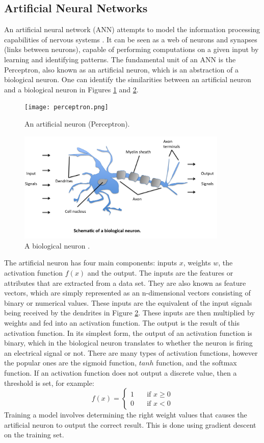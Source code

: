\documentclass{UoYCSproject}
\begin{document}
\subsection{Artificial Neural Networks}
An artificial neural network (ANN) attempts to model the information processing capabilities of nervous systems \cite{rojas2013neural}. It can be seen as a web of neurons and synapses (links between neurons), capable of performing computations on a given input by learning and identifying patterns. The fundamental unit of an ANN is the Perceptron, also known as an artificial neuron, which is an abstraction of a biological neuron. One can identify the similarities between an artificial neuron and a biological neuron in Figures \ref{fig:artificialneuron} and \ref{fig:biologicalneuron}.  

\begin{figure}[h]
\texttt{[image: perceptron.png]}
\centering
\caption{An artificial neuron (Perceptron).} 
\label{fig:artificialneuron}
\end{figure}

\begin{figure}[h]
\includegraphics[width=10cm]{perceptron_neuron.png}
\centering
\caption{A biological neuron \cite{neuron}.} 
\label{fig:biologicalneuron}
\end{figure}

The artificial neuron has four main components: inputs $x$, weights $w$, the activation function $f(x)$ and the output. The inputs are the features or attributes that are extracted from a data set. They are also known as feature vectors, which are simply represented as an n-dimensional vectors consisting of binary or numerical values. These inputs are the equivalent of the input signals being received by the dendrites in Figure \ref{fig:biologicalneuron}. These inputs are then multiplied by weights and fed into an activation function. The output is the result of this activation function. In its simplest form, the output of an activation function is binary, which in the biological neuron translates to whether the neuron is firing an electrical signal or not. There are many types of activation functions, however the popular ones are the sigmoid function, $tanh$ function, and the softmax function. If an activation function does not output a discrete value, then a threshold is set, for example:  \[ f(x) =
  \begin{cases}
    1       & \quad \text{if } x \geq 0\\
    0       & \quad \text{if } x < 0
  \end{cases}
\]
Training a model involves determining the right weight values that causes the artificial neuron to output the correct result. This is done using gradient descent on the training set. 
\end{document}
